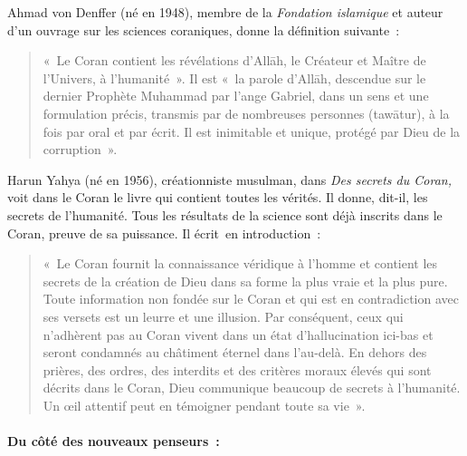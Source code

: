 Ahmad von Denffer (né en 1948), membre de la \emph{Fondation islamique}
et auteur d'un ouvrage sur les sciences coraniques, donne la définition
suivante~:
\begin{quote}
    

«~Le Coran contient les révélations d'Allāh, le Créateur et Maître de
l'Univers, à l'humanité~». Il est «~la parole d'Allāh, descendue sur le
dernier Prophète Muhammad par l'ange Gabriel, dans un sens et une
formulation précis, transmis par de nombreuses personnes (tawātur), à la
fois par oral et par écrit. Il est inimitable et unique, protégé par
Dieu de la corruption~».
\end{quote}
Harun Yahya (né en 1956), créationniste musulman, dans \emph{Des secrets
du Coran,} voit dans le Coran le livre qui contient toutes les vérités.
Il donne, dit-il, les secrets de l'humanité. Tous les résultats de la
science sont déjà inscrits dans le Coran, preuve de sa puissance. Il
écrit~en introduction~:
\begin{quote}
    

«~Le Coran fournit la connaissance véridique à l'homme et contient les
secrets de la création de Dieu dans sa forme la plus vraie et la plus
pure. Toute information non fondée sur le Coran et qui est en
contradiction avec ses versets est un leurre et une illusion. Par
conséquent, ceux qui n'adhèrent pas au Coran vivent dans un état
d'hallucination ici-bas et seront condamnés au châtiment éternel dans
l'au-delà. En dehors des prières, des ordres, des interdits et des
critères moraux élevés qui sont décrits dans le Coran, Dieu communique
beaucoup de secrets à l'humanité. Un œil attentif peut en témoigner
pendant toute sa vie~».
\end{quote}




\paragraph{Du côté des nouveaux penseurs~:
}

